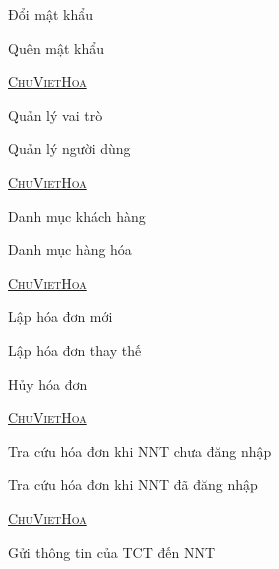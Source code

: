 Đổi mật khẩu

Quên mật khẩu



\underline{\textsc{ChuVietHoa}  } 







Quản lý vai trò

Quản lý người dùng


\underline{\textsc{ChuVietHoa}  } 





Danh mục khách hàng

Danh mục hàng hóa


\underline{\textsc{ChuVietHoa}  } 





Lập hóa đơn mới

Lập hóa đơn thay thế

Hủy hóa đơn


\underline{\textsc{ChuVietHoa}  } 




Tra cứu hóa đơn khi NNT chưa đăng nhập

Tra cứu hóa đơn khi NNT đã đăng nhập

\underline{\textsc{ChuVietHoa}  } 

Gửi thông tin của TCT đến NNT